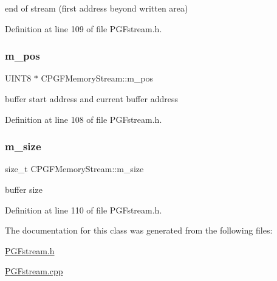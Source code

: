 end of stream (first address beyond written area) 



Definition at line 109 of file P\+G\+Fstream.\+h.

\mbox{\label{classCPGFMemoryStream_a901356d38f0aee983fa19bff73727ec6}} 
\subsubsection{\texorpdfstring{m\_pos}{m\_pos}}
{\footnotesize\ttfamily U\+I\+N\+T8 $\ast$ C\+P\+G\+F\+Memory\+Stream\+::m\+\_\+pos\hspace{0.3cm}{\ttfamily [protected]}}



buffer start address and current buffer address 



Definition at line 108 of file P\+G\+Fstream.\+h.

\mbox{\label{classCPGFMemoryStream_a640b0fa8b5cfef4ea4d25adc7bf30ffa}} 
\subsubsection{\texorpdfstring{m\_size}{m\_size}}
{\footnotesize\ttfamily size\+\_\+t C\+P\+G\+F\+Memory\+Stream\+::m\+\_\+size\hspace{0.3cm}{\ttfamily [protected]}}



buffer size 



Definition at line 110 of file P\+G\+Fstream.\+h.



The documentation for this class was generated from the following files\+:\begin{DoxyCompactItemize}
\item 
\mbox{\hyperlink{PGFstream_8h}{P\+G\+Fstream.\+h}}\item 
\mbox{\hyperlink{PGFstream_8cpp}{P\+G\+Fstream.\+cpp}}\end{DoxyCompactItemize}
